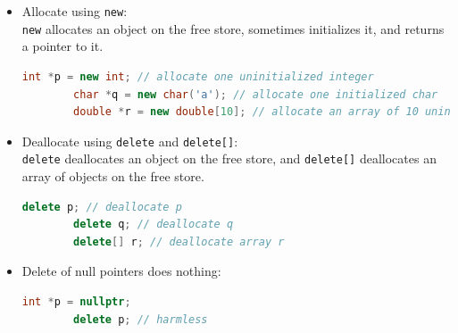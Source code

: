 \begin{itemize}
    \item Allocate using \texttt{new}:\\
    \texttt{new} allocates an object on the free store, sometimes initializes it, and returns a pointer to it.

    \begin{lstlisting}[language=C++]
        int *p = new int; // allocate one uninitialized integer
        char *q = new char('a'); // allocate one initialized char
        double *r = new double[10]; // allocate an array of 10 uninitialized doubles
    \end{lstlisting}

    \item Deallocate using \texttt{delete} and \texttt{delete[]}:\\
    \texttt{delete} deallocates an object on the free store, and \texttt{delete[]} deallocates an array of objects on the free store.

    \begin{lstlisting}[language=C++]
        delete p; // deallocate p
        delete q; // deallocate q
        delete[] r; // deallocate array r
    \end{lstlisting}

    \item Delete of null pointers does nothing:
    \begin{lstlisting}[language=C++]
        int *p = nullptr;
        delete p; // harmless
    \end{lstlisting}

\end{itemize}